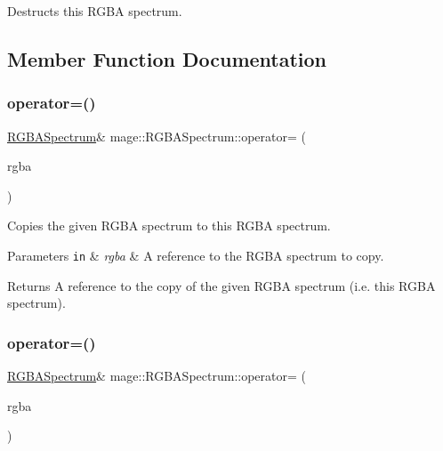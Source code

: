 Destructs this R\+G\+BA spectrum. 

\subsection{Member Function Documentation}
\hypertarget{structmage_1_1_r_g_b_a_spectrum_a1b9910f5ce9cb368b88e1b02fb4c4c72}{}\label{structmage_1_1_r_g_b_a_spectrum_a1b9910f5ce9cb368b88e1b02fb4c4c72} 
\subsubsection{\texorpdfstring{operator=()}{operator=()}\hspace{0.1cm}{\footnotesize\ttfamily [1/2]}}
{\footnotesize\ttfamily \hyperlink{structmage_1_1_r_g_b_a_spectrum}{R\+G\+B\+A\+Spectrum}\& mage\+::\+R\+G\+B\+A\+Spectrum\+::operator= (\begin{DoxyParamCaption}\item[{const \hyperlink{structmage_1_1_r_g_b_a_spectrum}{R\+G\+B\+A\+Spectrum} \&}]{rgba }\end{DoxyParamCaption})\hspace{0.3cm}{\ttfamily [default]}}

Copies the given R\+G\+BA spectrum to this R\+G\+BA spectrum.


\begin{DoxyParams}[1]{Parameters}
\mbox{\tt in}  & {\em rgba} & A reference to the R\+G\+BA spectrum to copy. \\
\hline
\end{DoxyParams}
\begin{DoxyReturn}{Returns}
A reference to the copy of the given R\+G\+BA spectrum (i.\+e. this R\+G\+BA spectrum). 
\end{DoxyReturn}
\hypertarget{structmage_1_1_r_g_b_a_spectrum_ae23c094db4110804cf4b3bc0a00af131}{}\label{structmage_1_1_r_g_b_a_spectrum_ae23c094db4110804cf4b3bc0a00af131} 
\subsubsection{\texorpdfstring{operator=()}{operator=()}\hspace{0.1cm}{\footnotesize\ttfamily [2/2]}}
{\footnotesize\ttfamily \hyperlink{structmage_1_1_r_g_b_a_spectrum}{R\+G\+B\+A\+Spectrum}\& mage\+::\+R\+G\+B\+A\+Spectrum\+::operator= (\begin{DoxyParamCaption}\item[{\hyperlink{structmage_1_1_r_g_b_a_spectrum}{R\+G\+B\+A\+Spectrum} \&\&}]{rgba }\end{DoxyParamCaption})\hspace{0.3cm}{\ttfamily [default]}}

